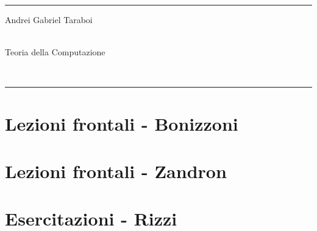 \documentclass[a4paper,openany]{article}
\begin{document}

\fancyhead[C]{}
\hrule \medskip %
\begin{minipage}{0.295\textwidth} 
\raggedright
\footnotesize
Andrei Gabriel Taraboi \hfill\\   
\hfill\\
\end{minipage}
\begin{minipage}{0.4\textwidth} 
\centering 
\large 
Teoria della Computazione\\ 
\normalsize 
\end{minipage}
\begin{minipage}{0.295\textwidth} 
\raggedleft
\hfill\\
\end{minipage}
\medskip\hrule 
\bigskip

\raggedbottom
\tableofcontents
\newpage
\part{Lezioni frontali - Bonizzoni}










\part{Lezioni frontali - Zandron}









\part{Esercitazioni - Rizzi}








\end{document}
